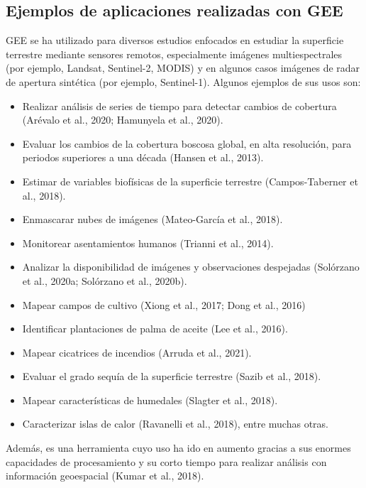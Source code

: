\documentclass[
  12pt,
  letterpaper,
  twoside]{book}
\providecommand{\tightlist}{%
  \setlength{\itemsep}{0pt}\setlength{\parskip}{0pt}}
\begin{document}
\hypertarget{ejemplos-de-aplicaciones-realizadas-con-gee}{%
\subsection{Ejemplos de aplicaciones realizadas con GEE}\label{ejemplos-de-aplicaciones-realizadas-con-gee}}

GEE se ha utilizado para diversos estudios enfocados en estudiar la superficie terrestre mediante sensores remotos, especialmente imágenes multiespectrales (por ejemplo, Landsat, Sentinel-2, MODIS) y en algunos casos imágenes de radar de apertura sintética (por ejemplo, Sentinel-1). Algunos ejemplos de sus usos son:

\begin{itemize}
\tightlist
\item
  Realizar análisis de series de tiempo para detectar cambios de cobertura (Arévalo et al., 2020; Hamunyela et al., 2020).
\item
  Evaluar los cambios de la cobertura boscosa global, en alta resolución, para periodos superiores a una década (Hansen et al., 2013).
\item
  Estimar de variables biofísicas de la superficie terrestre (Campos-Taberner et al., 2018).
\item
  Enmascarar nubes de imágenes (Mateo-García et al., 2018).
\item
  Monitorear asentamientos humanos (Trianni et al., 2014).
\item
  Analizar la disponibilidad de imágenes y observaciones despejadas (Solórzano et al., 2020a; Solórzano et al., 2020b).
\item
  Mapear campos de cultivo (Xiong et al., 2017; Dong et al., 2016)
\item
  Identificar plantaciones de palma de aceite (Lee et al., 2016).
\item
  Mapear cicatrices de incendios (Arruda et al., 2021).
\item
  Evaluar el grado sequía de la superficie terrestre (Sazib et al., 2018).
\item
  Mapear características de humedales (Slagter et al., 2018).
\item
  Caracterizar islas de calor (Ravanelli et al., 2018), entre muchas otras.
\end{itemize}

Además, es una herramienta cuyo uso ha ido en aumento gracias a sus enormes capacidades de procesamiento y su corto tiempo para realizar análisis con información geoespacial (Kumar et al., 2018).
\end{document}
